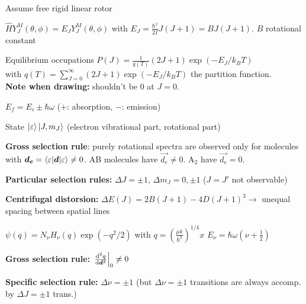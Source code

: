 \begin{squishlist}
    \item Assume free rigid linear rotor
    \item $\hat{H} Y_J^M(\theta, \phi) = E_J Y_J^M(\theta, \phi)$ with $E_J = \frac{\hbar^2}{2I} J (J+1) = B J(J+1)$. $B$ rotational constant
    \item Equilibrium occupations $P(J) = \frac{1}{q(T)} (2J+1) \exp(-E_J / k_B T)$ \\
    with $q(T) = \sum_{J=0}^{\infty} (2J+1) \exp(-E_J / k_B T)$ the partition function. \\ 
    \textbf{Note when drawing:} shouldn't be $0$ at $J=0$.

    \item $E_f = E_i \pm \hbar \omega$ ($+$: absorption, $-$: emission)
    \item State $\ket{\varepsilon} \ket{J, m_J}$ (electron vibrational part, rotational part)
    \item \textbf{Gross selection rule}: purely rotational spectra are observed only for molecules with $\bm{d_e} = \braket{\varepsilon|\bm{d}|\varepsilon} \neq 0$. AB molecules have $\vec{d_e} \neq 0$. A$_2$ have $\vec{d_e} = 0$.
    \item \textbf{Particular selection rules:} $\Delta J = \pm 1$, $\Delta m_J = 0, \pm 1$ ($J=J'$ not observable)
    \item \textbf{Centrifugal distorsion:} $\Delta E(J) = 2B (J+1) - 4D(J+1)^3 \longrightarrow$ unequal spacing between spatial lines
\end{squishlist}

\begin{squishlist}
    \item $\psi(q) = N_{\nu} H_{\nu}(q) \exp(-q^2/2)$ with $q = \left(\frac{\mu k}{\hbar^2}\right)^{1/4}x$ \squishsep $E_{\nu} = \hbar \omega (\nu + \frac{1}{2})$
    \item \textbf{Gross selection rule:} $\left.\frac{\textrm{d}^2 q}{\textrm{d} \bm{d}^2}\right|_0 \neq 0$
    \item \textbf{Specific selection rule:} $\Delta \nu = \pm 1$ (but $\Delta \nu = \pm 1$ transitions are always accomp. by $\Delta J = \pm 1$ trans.)
\end{squishlist}

